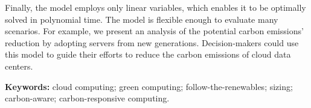Finally, the model employs only linear variables, which enables it to be optimally solved in polynomial time. The model is flexible enough to evaluate many scenarios. For example, we present an analysis of the potential carbon emissions' reduction by adopting servers from new generations. Decision-makers could use this model to guide their efforts to reduce the carbon emissions of cloud data centers. 


\textbf{Keywords:} cloud computing; green computing; follow-the-renewables; sizing; carbon-aware; carbon-responsive computing. 